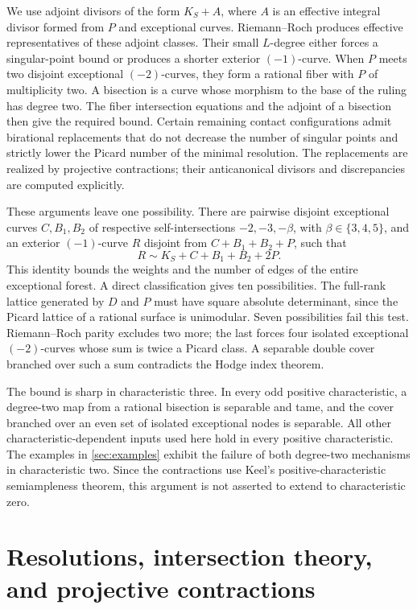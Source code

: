 \documentclass[11pt,reqno]{amsart}
\theoremstyle{definition}
\theoremstyle{remark}
\numberwithin{equation}{section}
\begin{document}
We use adjoint divisors of the form $K_S+A$, where $A$ is an effective
integral divisor formed from $P$ and exceptional curves. Riemann--Roch
produces effective representatives of these adjoint classes. Their small $L$-degree either
forces a singular-point bound or produces a shorter exterior
$(-1)$-curve. When $P$ meets two disjoint exceptional $(-2)$-curves,
they form a rational fiber with $P$ of multiplicity two. A bisection is
a curve whose morphism to the base of the ruling has degree two.
The fiber intersection equations and the adjoint of a bisection then
give the required bound. Certain remaining contact configurations admit
birational replacements that do not decrease the number of singular
points and strictly lower the Picard number of the minimal resolution.
The replacements are realized by projective contractions; their
anticanonical divisors and discrepancies are computed explicitly.

These arguments leave one possibility. There are pairwise disjoint
exceptional curves $C,B_1,B_2$ of respective self-intersections
$-2,-3,-\beta$, with $\beta\in\{3,4,5\}$, and an exterior $(-1)$-curve
$R$ disjoint from $C+B_1+B_2+P$, such that
\[
 R\sim K_S+C+B_1+B_2+2P.
\]
This identity bounds the weights and the number of edges of the entire
exceptional forest. A direct classification gives ten possibilities.
The full-rank lattice generated by $D$ and $P$ must have square
absolute determinant, since the Picard lattice of a rational surface
is unimodular. Seven possibilities fail this test. Riemann--Roch
parity excludes two more; the last forces four isolated exceptional
$(-2)$-curves whose sum is twice a Picard class. A separable double
cover branched over such a sum contradicts the Hodge index theorem.

The bound is sharp in characteristic three. In every odd
positive characteristic, a degree-two map from a rational bisection is
separable and tame, and the cover branched over an even set of isolated
exceptional nodes is separable. All other characteristic-dependent
inputs used here hold in every positive characteristic. The examples
in \cref{sec:examples} exhibit the failure of both degree-two mechanisms
in characteristic two. Since the contractions use Keel's
positive-characteristic semiampleness theorem, this argument is not
asserted to extend to characteristic zero.

\tableofcontents

\section{Resolutions, intersection theory, and projective contractions}
\label{sec:preliminaries}
\end{document}
